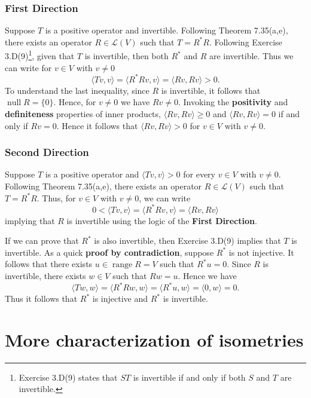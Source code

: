 \documentclass{article}
\begin{document}
\subsubsection*{First Direction}
Suppose $T$ is a positive operator and invertible. Following Theorem 7.35(a,e), there exists an operator $R\in\mathcal{L}(V)$ such that $T=R^*R$. Following Exercise 3.D(9)\footnote{Exercise 3.D(9) states that $ST$ is invertible if and only if both $S$ and $T$ are invertible.}, given that $T$ is invertible, then both $R^*$ and $R$ are invertible. Thus we can write for $v\in V$ with $v\neq 0$
\[\langle Tv,v\rangle=\langle R^*Rv,v\rangle=\langle Rv,Rv\rangle >0.\]
To understand the last inequality, since $R$ is invertible, it follows that $\operatorname{null}R=\{0\}$. Hence, for $v\neq 0$ we have $Rv\neq 0$. Invoking the \textbf{positivity} and \textbf{definiteness} properties of inner products, $\langle Rv,Rv\rangle \geq0$ and $\langle Rv,Rv\rangle =0$ if and only if $Rv=0$. Hence it follows that $\langle Rv,Rv\rangle >0$ for $v\in V$ with $v\neq 0$.

\subsubsection*{Second Direction}
Suppose $T$ is a positive operator and $\langle Tv,v\rangle > 0$ for every $v\in V$ with $v\neq 0$. Following Theorem 7.35(a,e), there exists an operator $R\in\mathcal{L}(V)$ such that $T=R^*R$. Thus, for $v\in V$ with $v\neq 0$, we can write
\[0<\langle Tv,v\rangle=\langle R^*Rv,v\rangle=\langle Rv,Rv\rangle\]
implying that $R$ is invertible using the logic of the \textbf{First Direction}.

If we can prove that $R^*$ is also invertible, then Exercise 3.D(9) implies that $T$ is invertible. As a quick \textbf{proof by contradiction}, suppose $R^*$ is not injective. It follows that there exists $u\in\operatorname{range}R=V$ such that $R^*u =0$. Since $R$ is invertible, there exists $w\in V$ such that $Rw=u$. Hence we have
\[\langle Tw,w\rangle=\langle R^*Rw,w\rangle=\langle R^*u,w\rangle=\langle 0,w\rangle=0.\]
Thus it follows that $R^*$ is injective and $R^*$ is invertible.

\clearpage

\renewcommand{\thesection}{10}
\section{More characterization of isometries}
\end{document}
